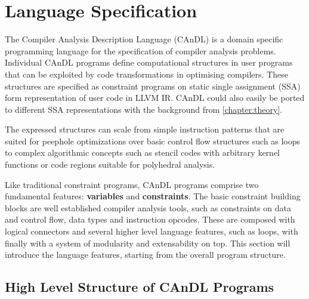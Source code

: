 \begin{figure}[p]
    
    \label{fig:candlexample}
\end{figure}

\section{Language Specification}

    The Compiler Analysis Description Language (CAnDL) is a domain specific
    programming language for the specification of compiler analysis problems. 
    Individual CAnDL programs define computational structures in user programs
    that can be exploited by code transformations in optimising compilers.
    These structures are specified as constraint programs on static single
    assignment (SSA) form representation of user code in LLVM IR.
    CAnDL could also easily be ported to different SSA representations with the
    background from \autoref{chapter:theory}.

    The expressed structures can scale from simple instruction patterns that are
    suited for peephole optimizations over basic control flow structures such as
    loops to complex algorithmic concepts such as stencil codes with arbitrary
    kernel functions or code regions suitable for polyhedral analysis.

    Like traditional constraint programs, CAnDL programs comprise two
    fundamental features: \textbf{variables} and \textbf{constraints}.
    The basic constraint building blocks are well established compiler analysis
    tools, such as constraints on data and control flow, data types and
    instruction opcodes.
    These are composed with logical connectors and several higher level language
    features, such as loops, with finally with a system of modularity and
    extensability on top.
    This section will introduce the language features,
    starting from the overall program structure.

\subsection{High Level Structure of CAnDL Programs}

